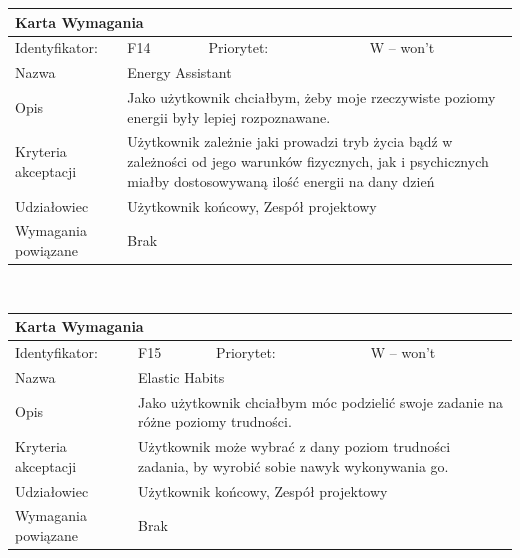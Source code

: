 \documentclass[a4paper,11pt]{report}
\begin{document}
		\newline
		\vspace*{0,2 cm}
		\newline
		\begin{tabular}{|p{3cm}|p{2cm}|p{2cm}|p{6cm}|}
		\hline
		\multicolumn{4}{|p{12 cm}|}{Karta Wymagania}\\
		\hline
		Identyfikator: & F14 & Priorytet: & W – won't\\
		\hline
		Nazwa & \multicolumn{3}{|p{10 cm}|}{Energy Assistant}\\
		\hline
		Opis & \multicolumn{3}{|p{10 cm}|}{Jako użytkownik chciałbym, żeby moje rzeczywiste poziomy energii były lepiej rozpoznawane.}\\
		\hline
		Kryteria akceptacji & \multicolumn{3}{|p{10 cm}|}{Użytkownik zależnie jaki prowadzi tryb życia bądź w zależności od jego warunków fizycznych, jak i psychicznych miałby dostosowywaną ilość energii na dany dzień}\\
		\hline
		Udziałowiec & \multicolumn{3}{|p{10 cm}|}{Użytkownik końcowy, Zespół projektowy}\\
		\hline
		Wymagania powiązane & \multicolumn{3}{|p{10 cm}|}{Brak}\\
		\hline
		\end{tabular}\\
		\newline
		\vspace*{0,2 cm}
		\newline
		\begin{tabular}{|p{3cm}|p{2cm}|p{2cm}|p{6cm}|}
		\hline
		\multicolumn{4}{|p{12 cm}|}{Karta Wymagania}\\
		\hline
		Identyfikator: & F15 & Priorytet: & W – won't\\
		\hline
		Nazwa & \multicolumn{3}{|p{10 cm}|}{Elastic Habits}\\
		\hline
		Opis & \multicolumn{3}{|p{10 cm}|}{Jako użytkownik chciałbym móc podzielić swoje zadanie na różne poziomy trudności.}\\
		\hline
		Kryteria akceptacji & \multicolumn{3}{|p{10 cm}|}{Użytkownik może wybrać z dany poziom trudności zadania, by wyrobić sobie nawyk wykonywania go.}\\
		\hline
		Udziałowiec & \multicolumn{3}{|p{10 cm}|}{Użytkownik końcowy, Zespół projektowy}\\
		\hline
		Wymagania powiązane & \multicolumn{3}{|p{10 cm}|}{Brak}\\
		\hline
		\end{tabular}\\
\end{document}
